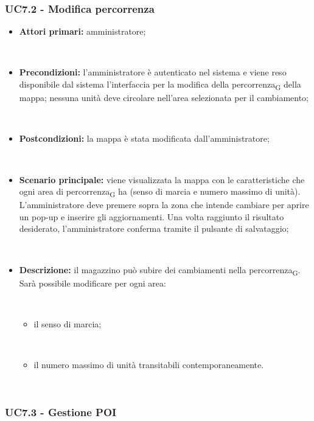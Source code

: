 \subsubsection{UC7.2 - Modifica percorrenza}

\begin{itemize}

​    \item   \textbf{Attori primari:} amministratore;

​    \item   \textbf{Precondizioni:}  l'amministratore è autenticato nel sistema e viene reso disponibile dal sistema l'interfaccia per la modifica della percorrenza\textsubscript{G} della mappa; nessuna unità deve circolare nell'area selezionata per il cambiamento;

​    \item   \textbf{Postcondizioni:} la mappa è stata modificata dall'amministratore;

​    \item   \textbf{Scenario principale:} viene visualizzata la mappa con le caratteristiche che ogni area di percorrenza\textsubscript{G} ha (senso di marcia e numero massimo di unità). L'amministratore deve premere sopra la zona che intende cambiare per aprire un pop-up e inserire gli aggiornamenti. Una volta raggiunto il risultato desiderato, l'amministratore conferma tramite il pulsante di salvataggio;

​    \item   \textbf{Descrizione:} il magazzino può subire dei cambiamenti nella percorrenza\textsubscript{G}. Sarà possibile modificare per ogni area:

​    \begin{itemize}

​        \item il senso di marcia;

​        \item il numero massimo di unità transitabili contemporaneamente.

​    \end{itemize}

\end{itemize}



\subsubsection{UC7.3 - Gestione POI}



